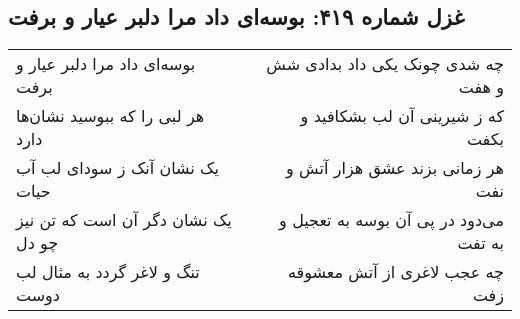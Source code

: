 \begin{center}
\section*{غزل شماره ۴۱۹: بوسه‌ای داد مرا دلبر عیار و برفت}
\label{sec:0419}
\begin{longtable}{l p{0.5cm} r}
بوسه‌ای داد مرا دلبر عیار و برفت
&&
چه شدی چونک یکی داد بدادی شش و هفت
\\
هر لبی را که ببوسید نشان‌ها دارد
&&
که ز شیرینی آن لب بشکافید و بکفت
\\
یک نشان آنک ز سودای لب آب حیات
&&
هر زمانی بزند عشق هزار آتش و نفت
\\
یک نشان دگر آن است که تن نیز چو دل
&&
می‌دود در پی آن بوسه به تعجیل و به تفت
\\
تنگ و لاغر گردد به مثال لب دوست
&&
چه عجب لاغری از آتش معشوقه زفت
\\
\end{longtable}
\end{center}
